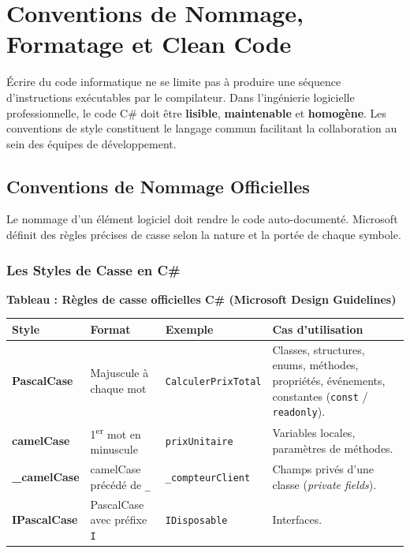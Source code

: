 
\section{Conventions de Nommage, Formatage et Clean Code}

Écrire du code informatique ne se limite pas à produire une séquence d'instructions exécutables par le compilateur. Dans l'ingénierie logicielle professionnelle, le code C\# doit être \textbf{lisible}, \textbf{maintenable} et \textbf{homogène}. Les conventions de style constituent le langage commun facilitant la collaboration au sein des équipes de développement.



\subsection{Conventions de Nommage Officielles}

Le nommage d'un élément logiciel doit rendre le code auto-documenté. Microsoft définit des règles précises de casse selon la nature et la portée de chaque symbole.

\subsubsection{Les Styles de Casse en C\#}

\begin{center}
    \textbf{Tableau : Règles de casse officielles C\# (Microsoft Design Guidelines)} \\[0.3cm]
    \begin{tabular}{@{}lllp{6cm}@{}}
        \toprule
        \textbf{Style} & \textbf{Format} & \textbf{Exemple} & \textbf{Cas d'utilisation} \\
        \midrule
        \textbf{PascalCase} & Majuscule à chaque mot & \texttt{CalculerPrixTotal} & Classes, structures, enums, méthodes, propriétés, événements, constantes (\texttt{const} / \texttt{readonly}). \\
        \textbf{camelCase} & 1\textsuperscript{er} mot en minuscule & \texttt{prixUnitaire} & Variables locales, paramètres de méthodes. \\
        \textbf{\_camelCase} & camelCase précédé de \texttt{\_} & \texttt{\_compteurClient} & Champs privés d'une classe (\emph{private fields}). \\
        \textbf{IPascalCase} & PascalCase avec préfixe \texttt{I} & \texttt{IDisposable} & Interfaces. \\
        \bottomrule
    \end{tabular}
\end{center}

